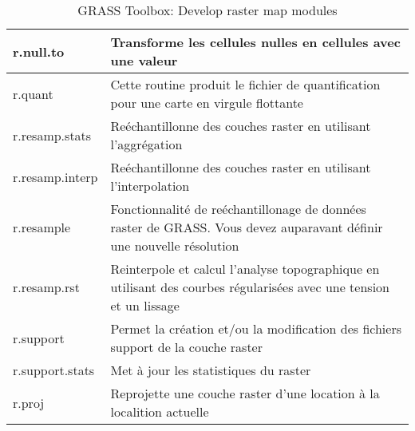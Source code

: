\begin{table}[H]
\begin{tabular}{|p{4cm}|p{10cm}|}
  \hline r.null.to & Transforme les cellules nulles en cellules avec une valeur\\
  \hline r.quant & Cette routine produit le fichier de quantification pour une carte en virgule flottante \\
  \hline r.resamp.stats & Reéchantillonne des couches raster en utilisant l'aggrégation \\
  \hline r.resamp.interp & Reéchantillonne des couches raster en utilisant l'interpolation \\
  \hline r.resample & Fonctionnalité de reéchantillonage de données raster de GRASS. Vous devez auparavant définir une nouvelle résolution \\
  \hline r.resamp.rst & Reinterpole et calcul l'analyse topographique en utilisant des courbes régularisées avec une tension et un lissage \\
  \hline r.support & Permet la création et/ou la modification des fichiers support de la couche raster\\
  \hline r.support.stats & Met à jour les statistiques du raster \\
  \hline r.proj & Reprojette une couche raster d'une location à la localition actuelle \\
\hline
\end{tabular}
\caption{GRASS Toolbox: Develop raster map modules}
\end{table}

